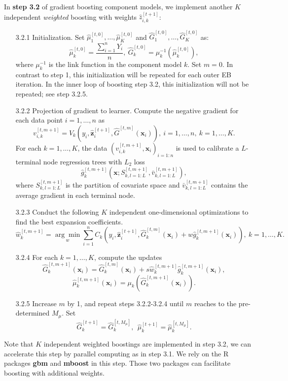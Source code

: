 \documentclass[11pt]{article}
\numberwithin{equation}{section}
\def\bx{\boldsymbol{x}}
\def\bz{\boldsymbol{z}}
\newcounter{saveenumi}
\newcommand{\seti}{\setcounter{saveenumi}{\value{enumi}}}
\begin{document}
In {\bf step 3.2} of gradient boosting component models, we implement another $K$ independent {\it weighted} boosting with weights $\hat{z}_{i,k}^{[t+1]}$:
	\begin{enumerate}
		\item[3.2.1] Initialization. Set $\hat{\mu}_1^{[t,0]},\ldots,\hat{\mu}_K^{[t,0]}$ and $\hat{G}_1^{[t,0]},\ldots,\hat{G}_K^{[t,0]}$ as:
			\begin{equation}\label{ini-2}
				\hat{\mu}_k^{[t,0]}=\frac{\sum_{i=1}^nY_i}{n},~ \hat{G}_k^{[t,0]}=\mu_k^{-1}(\hat{\mu}_k^{[t,0]}),
					\end{equation}
		where $\mu^{-1}_k$ is the link function in the component model $k$. 
		Set $m=0$.
		In contrast to step 1, this initialization will be repeated for each outer EB iteration.
		In the inner loop of boosting step 3.2, this initialization will not be repeated; see step 3.2.5. 
		\item[3.2.2] Projection of gradient to learner.
		Compute the negative gradient for each data point $i=1,\ldots,n$ as 
		$$v_{i,k}^{[t,m+1]}=V_k(y_i,\hat{\bz}^{[t+1]}_{i},\hat{G}^{[t,m]}(\bx_i)),~ i=1,\ldots,n, ~k=1,\ldots,K.$$
		For each $k=1,\ldots,K$, the data $(v_{i,k}^{[t,m+1]},\bx_i)_{i=1:n}$ is used to calibrate a $L$-terminal node regression trees with $L_2$ loss $$\hat{g}_k^{[t,m+1]}\left(\bx;S^{[t,m+1]}_{k,l=1:L},\bar{v}^{[t,m+1]}_{k,l=1:L}\right),$$
		 where $S^{[t,m+1]}_{k,l=1:L}$ is the partition of covariate space and $\bar{v}^{[t,m+1]}_{k,l=1:L}$ contains the average gradient in each terminal node.
		
		\item[3.2.3]  Conduct the following $K$ independent one-dimensional optimizations to find the best expansion coefficients.
		$$\hat{w}_{k}^{[t,m+1]}=\underset{w}{\arg\min}\sum_{i=1}^n C_{k}(y_i,\hat{\bz}_i^{[t+1]},\hat{G}_k^{[t,m]}(\bx_i)+w\hat{g}_k^{[t,m+1]}(\bx_i)), ~ k=1,\ldots,K.$$
		
		\item[3.2.4]  For each $k=1,\ldots,K$, compute the updates
		$$\hat{G}_k^{[t,m+1]}(\bx_i)=\hat{G}_k^{[t,m]}(\bx_i)+s\hat{w}_{k}^{[t,m+1]}\hat{g}_{k}^{[t,m+1]}(\bx_i),$$
		$$\hat{\mu}_k^{[t,m+1]}(\bx_i)=\mu_k(\hat{G}_k^{[t,m+1]}(\bx_i)).$$
		\seti


		\item[3.2.5] Increase $m$ by 1, and repeat steps 3.2.2-3.2.4 until $m$ reaches to the pre-determined $M_\mu$. Set
		$$\hat{G}_k^{[t+1]}=\hat{G}_k^{[t,M_\mu]},~~\hat{\mu}_k^{[t+1]}=\hat{\mu}_k^{[t,M_\mu]}.$$
	\end{enumerate}
Note that $K$ independent weighted boostings are implemented in step 3.2, we can accelerate this step by parallel computing as in step 3.1.
We rely on the R packages {\bf gbm} and {\bf mboost} in this step. 
Those two packages can facilitate boosting with additional weights.
\end{document}
